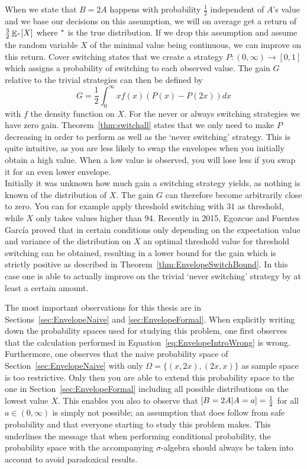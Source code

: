 \documentclass[a4paper]{report}
\theoremstyle{plain}
\theoremstyle{definition}
\theoremstyle{remark}
\numberwithin{equation}{chapter}
\let\P\relax
\DeclareMathOperator{\P}{\mathbb{P}}
\DeclareMathOperator{\E}{\mathbb{E}}
\DeclareMathOperator{\1}{\mathbbm{1}}
\begin{document}
When we state that $B=2A$ happens with probability $\frac{1}{2}$ independent of $A$'s value and we base our decisions on this assumption, we will on average get a return of $\frac{3}{2}\E_{\P^*}[X]$ where $\P^*$ is the true distribution. If we drop this assumption and assume the random variable $X$ of the minimal value being continuous, we can improve on this return. Cover switching states that we create a strategy $P\colon(0,\infty)\to[0,1]$ which assigns a probability of switching to each observed value. The gain $G$ relative to the trivial strategies can then be defined by
\begin{equation}
G=\frac{1}{2}\int_0^\infty xf(x)(P(x)-P(2x))dx
\end{equation}
with $f$ the density function on $X$. For the never or always switching strategies we have zero gain. Theorem~\ref{thm:switchall} states that we only need to make $P$ decreasing in order to perform as well as the `never switching' strategy. This is quite intuitive, as you are less likely to swap the envelopes when you initially obtain a high value. When a low value is observed, you will lose less if you swap it for an even lower envelope.\\
Initially it was unknown how much gain a switching strategy yields, as nothing is known of the distribution of $X$. The gain $G$ can therefore become arbitrarily close to zero. You can for example apply threshold switching with $31$ as threshold, while $X$ only takes values higher than $94$. Recently in 2015, Egozcue and Fuentes García \cite{Egozcue15} proved that in certain conditions only depending on the expectation value and variance of the distribution on $X$ an optimal threshold value for threshold switching can be obtained, resulting in a lower bound for the gain which is strictly positive as described in Theorem~\ref{thm:EnvelopeSwitchBound}. In this case one is able to actually improve on the trivial `never switching' strategy by at least a certain amount.

The most important observations for this thesis are in Sections~\ref{sec:EnvelopeNaive} and \ref{sec:EnvelopeFormal}. When explicitly writing down the probability spaces used for studying this problem, one first observes that the calculation performed in Equation~\ref{eq:EnvelopeIntroWrong} is wrong. Furthermore, one observes that the naive probability space of Section~\ref{sec:EnvelopeNaive} with only $\Omega=\{(x,2x),(2x,x)\}$ as sample space is too restrictive. Only then you are able to extend this probability space to the one in Section~\ref{sec:EnvelopeFormal} including all possible distributions on the lowest value $X$. This enables you also to observe that $\P[B=2A|A=a]=\frac{1}{2}$ for all $a\in(0,\infty)$ is simply not possible; an assumption that does follow from safe probability and that everyone starting to study this problem makes. This underlines the message that when performing conditional probability, the probability space with the accompanying $\sigma$-algebra should always be taken into account to avoid paradoxical results.
\end{document}
